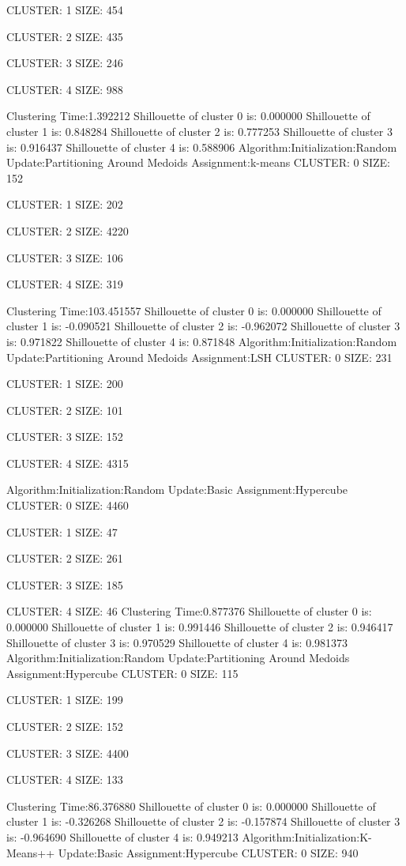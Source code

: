 \documentclass{article}
\begin{document}
CLUSTER: 1 SIZE: 454 

CLUSTER: 2 SIZE: 435 

CLUSTER: 3 SIZE: 246 

CLUSTER: 4 SIZE: 988 

Clustering Time:1.392212
Shillouette of cluster 0 is: 0.000000
Shillouette of cluster 1 is: 0.848284
Shillouette of cluster 2 is: 0.777253
Shillouette of cluster 3 is: 0.916437
Shillouette of cluster 4 is: 0.588906
Algorithm:Initialization:Random Update:Partitioning Around Medoids Assignment:k-means
CLUSTER: 0 SIZE: 152  

CLUSTER: 1 SIZE: 202 

CLUSTER: 2 SIZE: 4220 

CLUSTER: 3 SIZE: 106 

CLUSTER: 4 SIZE: 319

Clustering Time:103.451557
Shillouette of cluster 0 is: 0.000000
Shillouette of cluster 1 is: -0.090521
Shillouette of cluster 2 is: -0.962072
Shillouette of cluster 3 is: 0.971822
Shillouette of cluster 4 is: 0.871848
Algorithm:Initialization:Random Update:Partitioning Around Medoids Assignment:LSH
CLUSTER: 0 SIZE: 231 

CLUSTER: 1 SIZE: 200 

CLUSTER: 2 SIZE: 101 

CLUSTER: 3 SIZE: 152 

CLUSTER: 4 SIZE: 4315 

Algorithm:Initialization:Random Update:Basic Assignment:Hypercube
CLUSTER: 0 SIZE: 4460  

CLUSTER: 1 SIZE: 47

CLUSTER: 2 SIZE: 261 

CLUSTER: 3 SIZE: 185 

CLUSTER: 4 SIZE: 46 
Clustering Time:0.877376
Shillouette of cluster 0 is: 0.000000
Shillouette of cluster 1 is: 0.991446
Shillouette of cluster 2 is: 0.946417
Shillouette of cluster 3 is: 0.970529
Shillouette of cluster 4 is: 0.981373
Algorithm:Initialization:Random Update:Partitioning Around Medoids Assignment:Hypercube
CLUSTER: 0 SIZE: 115 

CLUSTER: 1 SIZE: 199 

CLUSTER: 2 SIZE: 152 

CLUSTER: 3 SIZE: 4400 

CLUSTER: 4 SIZE: 133

Clustering Time:86.376880
Shillouette of cluster 0 is: 0.000000
Shillouette of cluster 1 is: -0.326268
Shillouette of cluster 2 is: -0.157874
Shillouette of cluster 3 is: -0.964690
Shillouette of cluster 4 is: 0.949213
Algorithm:Initialization:K-Means++ Update:Basic Assignment:Hypercube
CLUSTER: 0 SIZE: 940 
\end{document}
